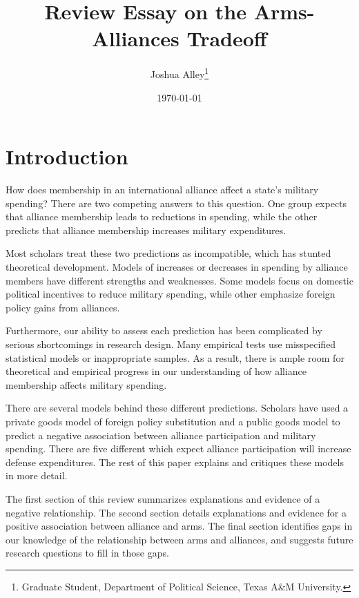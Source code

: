 \documentclass[12pt]{article}
\title{\textbf{Review Essay on the Arms-Alliances Tradeoff}}
\author{Joshua Alley\footnote{Graduate Student,
Department of Political Science, Texas A\&M University.}}
\date{{\normalsize \today}}
\begin{document}
\maketitle 

\doublespace



\section{Introduction}

How does membership in an international alliance affect a state's military spending? 
There are two competing answers to this question. 
One group expects that alliance membership leads to reductions in spending, while the other predicts that alliance membership increases military expenditures. 


Most scholars treat these two predictions as incompatible, which has stunted theoretical development. 
Models of increases or decreases in spending by alliance members have different strengths and weaknesses. 
Some models focus on domestic political incentives to reduce military spending, while other emphasize foreign policy gains from alliances. 


Furthermore, our ability to assess each prediction has been complicated by serious shortcomings in research design.
Many empirical tests use misspecified statistical models or inappropriate samples.
As a result, there is ample room for theoretical and empirical progress in our understanding of how alliance membership affects military spending. 
 

There are several models behind these different predictions. 
Scholars have used a private goods model of foreign policy substitution and a public goods model to predict a negative association between alliance participation and military spending. 
There are five different which expect alliance participation will increase defense expenditures. 
The rest of this paper explains and critiques these models in more detail. 


The first section of this review summarizes explanations and evidence of a negative relationship. 
The second section details explanations and evidence for a positive association between alliance and arms. 
The final section identifies gaps in our knowledge of the relationship between arms and alliances, and suggests future research questions to fill in those gaps. 
\end{document}
